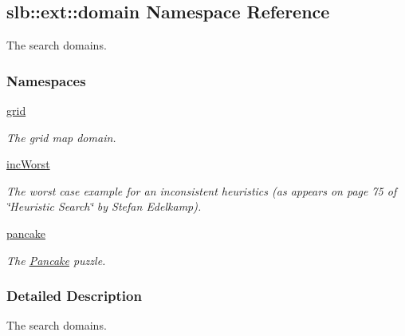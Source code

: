 \hypertarget{namespaceslb_1_1ext_1_1domain}{}\subsection{slb\+:\+:ext\+:\+:domain Namespace Reference}
\label{namespaceslb_1_1ext_1_1domain}


The search domains.  


\subsubsection*{Namespaces}
\begin{DoxyCompactItemize}
\item 
 \hyperlink{namespaceslb_1_1ext_1_1domain_1_1grid}{grid}
\begin{DoxyCompactList}\small\item\em The grid map domain. \end{DoxyCompactList}\item 
 \hyperlink{namespaceslb_1_1ext_1_1domain_1_1incWorst}{inc\+Worst}
\begin{DoxyCompactList}\small\item\em The worst case example for an inconsistent heuristics (as appears on page 75 of \char`\"{}\+Heuristic Search\char`\"{} by Stefan Edelkamp). \end{DoxyCompactList}\item 
 \hyperlink{namespaceslb_1_1ext_1_1domain_1_1pancake}{pancake}
\begin{DoxyCompactList}\small\item\em The \hyperlink{structslb_1_1ext_1_1domain_1_1pancake_1_1Pancake}{Pancake} puzzle. \end{DoxyCompactList}\end{DoxyCompactItemize}


\subsubsection{Detailed Description}
The search domains. 